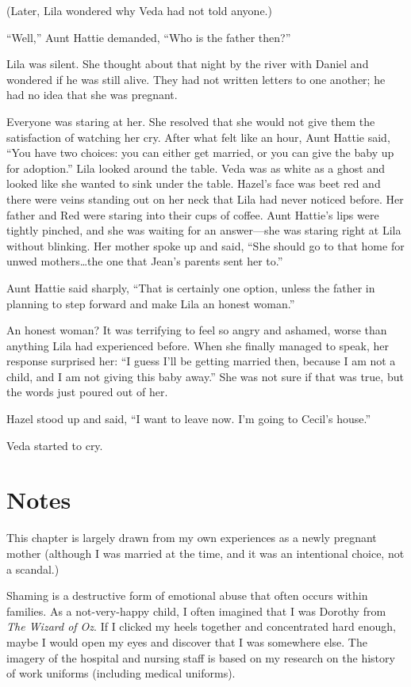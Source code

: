 \documentclass[
  american,
  letterpaper,
]{book}
\begin{document}
(Later, Lila wondered why Veda had not told anyone.)

``Well,'' Aunt Hattie demanded, ``Who is the father then?''

Lila was silent. She thought about that night by the river with Daniel
and wondered if he was still alive. They had not written letters to one
another; he had no idea that she was pregnant.

Everyone was staring at her. She resolved that she would not give them
the satisfaction of watching her cry. After what felt like an hour, Aunt
Hattie said, ``You have two choices: you can either get married, or you
can give the baby up for adoption.'' Lila looked around the table. Veda
was as white as a ghost and looked like she wanted to sink under the
table. Hazel's face was beet red and there were veins standing out on
her neck that Lila had never noticed before. Her father and Red were
staring into their cups of coffee. Aunt Hattie's lips were tightly
pinched, and she was waiting for an answer---she was staring right at
Lila without blinking. Her mother spoke up and said, ``She should go to
that home for unwed mothers\ldots the one that Jean's parents sent her
to.''

Aunt Hattie said sharply, ``That is certainly one option, unless the
father in planning to step forward and make Lila an honest woman.''

An honest woman? It was terrifying to feel so angry and ashamed, worse
than anything Lila had experienced before. When she finally managed to
speak, her response surprised her: ``I guess I'll be getting married
then, because I am not a child, and I am not giving this baby away.''
She was not sure if that was true, but the words just poured out of her.

Hazel stood up and said, ``I want to leave now. I'm going to Cecil's
house.''

Veda started to cry.

\section{Notes}\label{notes-32}

This chapter is largely drawn from my own experiences as a newly
pregnant mother (although I was married at the time, and it was an
intentional choice, not a scandal.)

Shaming is a destructive form of emotional abuse that often occurs
within families. As a not-very-happy child, I often imagined that I was
Dorothy from \emph{The Wizard of Oz}. If I clicked my heels together and
concentrated hard enough, maybe I would open my eyes and discover that I
was somewhere else. The imagery of the hospital and nursing staff is
based on my research on the history of work uniforms (including medical
uniforms).
\end{document}
